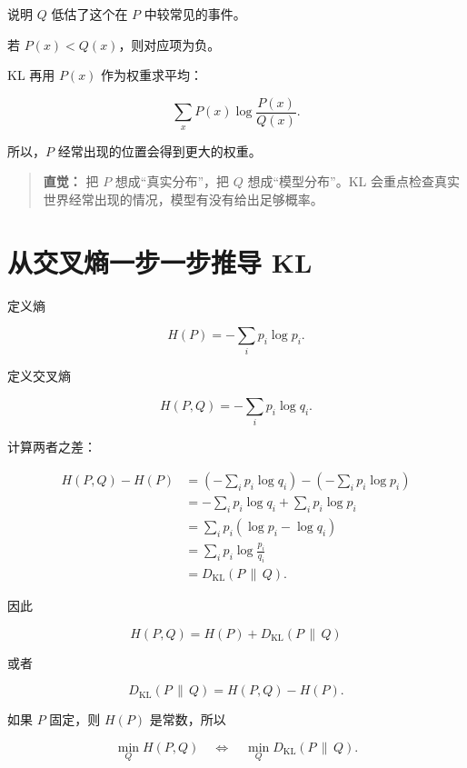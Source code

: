 \documentclass[11pt,a4paper]{ctexart}
\newcommand{\KL}[2]{D_{\mathrm{KL}}\!\left(#1\,\middle\|\,#2\right)}
\newenvironment{intuition}
{\begin{quote}\small\textbf{直觉：}}
{\end{quote}}
\begin{document}
说明 $Q$ 低估了这个在 $P$ 中较常见的事件。

若 $P(x)<Q(x)$，则对应项为负。

KL 再用 $P(x)$ 作为权重求平均：

\[
\sum_x P(x)\log\frac{P(x)}{Q(x)}.
\]

所以，$P$ 经常出现的位置会得到更大的权重。

\begin{intuition}
把 $P$ 想成“真实分布”，把 $Q$ 想成“模型分布”。KL 会重点检查真实世界经常出现的情况，模型有没有给出足够概率。
\end{intuition}

\section{从交叉熵一步一步推导 KL}

定义熵

\begin{equation}
H(P)
=
-\sum_i p_i\log p_i.
\end{equation}

定义交叉熵

\begin{equation}
H(P,Q)
=
-\sum_i p_i\log q_i.
\end{equation}

计算两者之差：

\begin{align}
H(P,Q)-H(P)
&=
\left(-\sum_i p_i\log q_i\right)
-
\left(-\sum_i p_i\log p_i\right)
\\
&=
-\sum_i p_i\log q_i
+
\sum_i p_i\log p_i
\\
&=
\sum_i p_i
\left(
\log p_i-\log q_i
\right)
\\
&=
\sum_i p_i
\log\frac{p_i}{q_i}
\\
&=
\KL{P}{Q}.
\end{align}

因此

\begin{equation}
\boxed{
H(P,Q)=H(P)+\KL{P}{Q}
}
\end{equation}

或者

\begin{equation}
\boxed{
\KL{P}{Q}=H(P,Q)-H(P).
}
\end{equation}

如果 $P$ 固定，则 $H(P)$ 是常数，所以

\[
\min_Q H(P,Q)
\quad\Longleftrightarrow\quad
\min_Q \KL{P}{Q}.
\]
\end{document}
